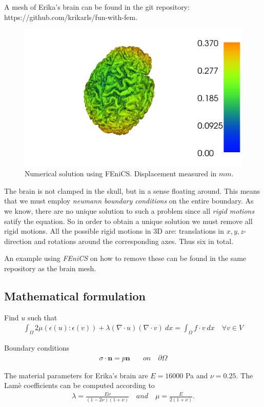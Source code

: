 \documentclass[epsfig,11pt]{article}
\begin{document}
A mesh of Erika's brain can be found in the git repository:
 https://github.com/krikarls/fun-with-fem. 
 
 \begin{figure}[h!] 
\begin{center}
  \includegraphics[scale=0.4]{brain.png}
  \end{center}
  \caption{Numerical solution using FEniCS. Displacement measured in $mm$.}
\end{figure}

The brain is not clamped in the skull, but in a sense floating around. This means that we must employ \emph{neumann boundary conditions} on the entire boundary. As we know, there are no unique solution to such a problem since all \emph{rigid motions} satify the equation. So in order to obtain a unique solution we must remove all rigid motions. All the possible rigid motions in 3D are: translations in $x,y,z$-direction and rotations around the corresponding axes. Thus six in total.

An example using \emph{FEniCS} on how to remove these can be found in the same repository as the brain mesh. 

\subsection{Mathematical formulation}

Find $u$ such that 
\begin{align*}
  \int_\Omega  2\mu (\epsilon(u) : \epsilon(v))  +\lambda (\nabla \cdot u) (\nabla \cdot v) \: dx = \int_\Omega f \cdot v \: dx \quad \forall v \in V
\end{align*} 

Boundary conditions
\begin{align*}
\sigma \cdot \mathbf{n} = p\mathbf{n} \quad &on \quad \partial \Omega
\end{align*}

The material parameters for Erika's brain are $E = 16000 $ Pa and $\nu = 0.25$. The Lamè coefficients can be computed according to 
\begin{align*}
\lambda = \frac{E \nu}{(1-2\nu)(1+\nu)} \quad and \quad \mu = \frac{E}{2(1+\nu)}.
\end{align*}



\end{document}
